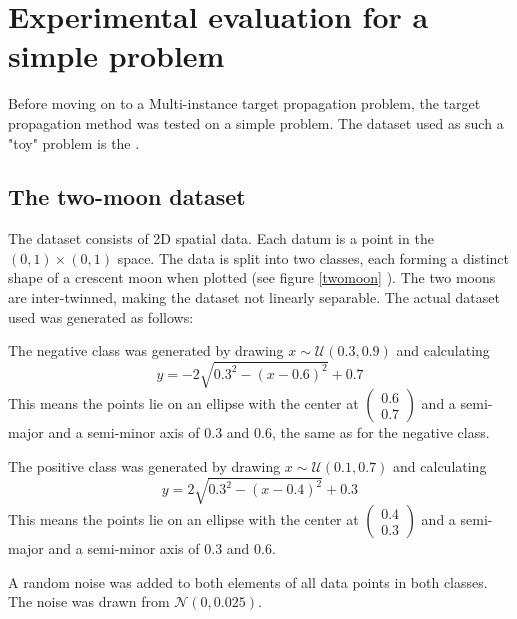 \chapter{Experimental evaluation for a simple problem}

Before moving on to a Multi-instance target propagation problem, the target propagation method was tested on a simple problem. The dataset used as such a "toy" problem is the .

\section{The two-moon dataset}
The dataset consists of 2D spatial data. Each datum is a point in the \( \left( 0, 1 \right) \times \left( 0, 1 \right) \) space. The data is split into two classes, each forming a distinct shape of a crescent moon when plotted (see figure \ref{twomoon} ). The two moons are inter-twinned, making the dataset not linearly separable. The actual dataset used was generated as follows:

The negative class was generated by drawing \( x \sim \mathcal{U} \left( 0.3, 0.9 \right) \) and calculating
\[ y = -2 \sqrt{0.3^2 - \left( x - 0.6 \right)^2} + 0.7 \]
This means the points lie on an ellipse with the center at \( \begin{pmatrix} 0.6 \\ 0.7 \end{pmatrix} \) and a semi-major and a semi-minor axis of \( 0.3 \) and \( 0.6 \), the same as for the negative class.

The positive class was generated by drawing \( x \sim \mathcal{U} \left( 0.1, 0.7 \right) \) and calculating
\[ y = 2 \sqrt{0.3^2 - \left( x - 0.4 \right)^2} + 0.3 \]
This means the points lie on an ellipse with the center at \( \begin{pmatrix} 0.4 \\ 0.3 \end{pmatrix} \) and a semi-major and a semi-minor axis of \( 0.3 \) and \( 0.6 \).

A random noise was added to both elements of all data points in both classes. The noise was drawn from \( \mathcal{N} \left(0, 0.025 \right) \).

